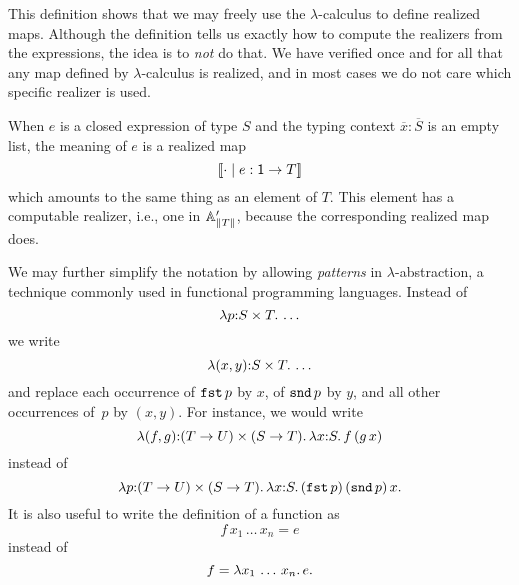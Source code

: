 %
This definition shows that we may freely use the $\lambda$-calculus to
define realized maps. Although the definition tells us exactly how to
compute the realizers from the expressions, the idea is to \emph{not}
do that. We have verified once and for all that any map defined by
$\lambda$-calculus is realized, and in most cases we do not care which
specific realizer is used.

When $e$ is a closed expression of type $S$ and the typing
context $\overline{x} : \overline{S}$ is an empty list, the
meaning of $e$ is a realized map
%
\begin{equation*}
  [\![{\cdot} \mid e : \mathsf{1} \to T]\!]
\end{equation*}
%
which amounts to the same thing as an element of $T$. This
element has a computable realizer, i.e., one in $\mathbb{A}'_{\|T\|}$,
because the corresponding realized map does.

We may further simplify the notation by allowing \emph{patterns} in
$\lambda$-abstraction, a technique commonly used in functional
programming languages. Instead of
%
\begin{equation*}
  \lambda p {:} S \times T .\,\ldots
\end{equation*}
%
we write
%
\begin{equation*}
  \lambda (x,y) {:} S \times T .\,\ldots
\end{equation*}
%
and replace each occurrence of $\mathtt{fst}\,p$ by $x$, of $\mathtt{snd}\,p$
by $y$, and all other occurrences of~$p$ by $(x,y)$. For instance, we
would write
%
\begin{equation*}
  \lambda (f,g) {:} (T \to U) \times (S \to T) .\,
    \lambda x {:} S .\,f\,(g\,x)
\end{equation*}
%
instead of
%
\begin{equation*}
  \lambda p {:} (T \to U) \times (S \to T) .\,
    \lambda x {:} S .\,(\mathtt{fst}\,p)\,(\mathtt{snd}\,p)\,x.
\end{equation*}
%
It is also useful to write the definition of a function as
%
\begin{equation*}
  f\,x_1\,\ldots\, x_n = e
\end{equation*}
%
instead of
%
\begin{equation*}
  f = \lambda x_1\,\ldots\, x_n .\,e.
\end{equation*}

